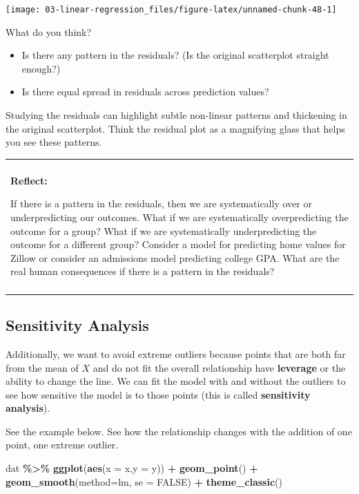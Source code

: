 \documentclass[
]{book}
\newenvironment{Shaded}{\begin{snugshade}}{\end{snugshade}}
\newcommand{\AttributeTok}[1]{\textcolor[rgb]{0.13,0.29,0.53}{#1}}
\newcommand{\ConstantTok}[1]{\textcolor[rgb]{0.56,0.35,0.01}{#1}}
\newcommand{\FunctionTok}[1]{\textcolor[rgb]{0.13,0.29,0.53}{\textbf{#1}}}
\newcommand{\NormalTok}[1]{#1}
\newcommand{\SpecialCharTok}[1]{\textcolor[rgb]{0.81,0.36,0.00}{\textbf{#1}}}
\newcommand{\StringTok}[1]{\textcolor[rgb]{0.31,0.60,0.02}{#1}}
\providecommand{\tightlist}{%
  \setlength{\itemsep}{0pt}\setlength{\parskip}{0pt}}
\newenvironment{reflect}
{
    \begin{center}
    
    \begin{tabular}{|p{0.8\textwidth}|}
    \rowcolor{LightBlue}
    \hline\\
    \rowcolor{LightBlue}
    \textbf{Reflect:}
}
{
    \\\rowcolor{LightBlue}
    \\\hline
    \end{tabular} 
    \end{center}
}
\begin{document}
\begin{center}\texttt{[image: 03-linear-regression\_files/figure-latex/unnamed-chunk-48-1]} \end{center}

What do you think?

\begin{itemize}
\tightlist
\item
  Is there any pattern in the residuals? (Is the original scatterplot straight enough?)
\item
  Is there equal spread in residuals across prediction values?
\end{itemize}

Studying the residuals can highlight subtle non-linear patterns and thickening in the original scatterplot. Think the residual plot as a magnifying glass that helps you see these patterns.

\begin{reflect}
If there is a pattern in the residuals, then we are systematically over
or underpredicting our outcomes. What if we are systematically
overpredicting the outcome for a group? What if we are systematically
underpredicting the outcome for a different group? Consider a model for
predicting home values for Zillow or consider an admissions model
predicting college GPA. What are the real human consequences if there is
a pattern in the residuals?
\end{reflect}

\subsection{Sensitivity Analysis}\label{sensitivity-analysis}

Additionally, we want to avoid extreme outliers because points that are both far from the mean of \(X\) and do not fit the overall relationship have \textbf{leverage} or the ability to change the line. We can fit the model with and without the outliers to see how sensitive the model is to those points (this is called \textbf{sensitivity analysis}).

See the example below. See how the relationship changes with the addition of one point, one extreme outlier.

\begin{Shaded}
\begin{Highlighting}[]
\NormalTok{dat }\SpecialCharTok{\%\textgreater{}\%}
  \FunctionTok{ggplot}\NormalTok{(}\FunctionTok{aes}\NormalTok{(}\AttributeTok{x =}\NormalTok{ x,}\AttributeTok{y =}\NormalTok{ y)) }\SpecialCharTok{+} 
  \FunctionTok{geom\_point}\NormalTok{() }\SpecialCharTok{+} 
  \FunctionTok{geom\_smooth}\NormalTok{(}\AttributeTok{method=}\StringTok{\textquotesingle{}lm\textquotesingle{}}\NormalTok{, }\AttributeTok{se =} \ConstantTok{FALSE}\NormalTok{) }\SpecialCharTok{+} 
  \FunctionTok{theme\_classic}\NormalTok{() }
\end{Highlighting}
\end{Shaded}
\end{document}

